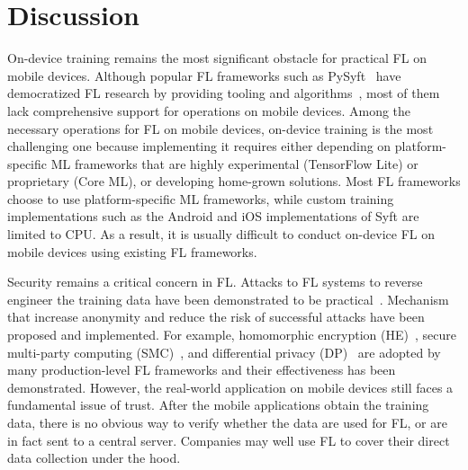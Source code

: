 \documentclass[conference]{IEEEtran}
\begin{document}
\section{Discussion}


On-device training remains the most significant obstacle for
practical FL on mobile devices.
Although popular FL frameworks such as
PySyft~\cite{ryffel2018generic,Ziller2021,hall2021syft}
have democratized FL research by providing tooling and
algorithms~\cite{sriraman2022device},
most of them lack comprehensive support for operations on mobile devices.
Among the necessary operations for FL on mobile devices,
on-device training is the most challenging one because
implementing it requires either depending on
platform-specific ML frameworks that are highly experimental (TensorFlow Lite)
or proprietary (Core ML),
or developing home-grown solutions.
Most FL frameworks choose to use platform-specific ML frameworks,
while custom training implementations such as
the Android and iOS implementations of Syft are limited to CPU.
As a result, it is usually difficult to conduct on-device FL
on mobile devices using existing FL frameworks.

Security remains a critical concern in FL.
Attacks to FL systems to reverse engineer the training data have been
demonstrated to be practical~\cite{sun2019really}.
Mechanism that increase anonymity and
reduce the risk of successful attacks have been proposed and implemented.
For example,
homomorphic encryption (HE)~\cite{wang2020homo},
secure multi-party computing (SMC)~\cite{bonawitz2016practical}, and
differential privacy
(DP)~\cite{dwork2006differential,geyer2017differentially} are
adopted by many production-level FL frameworks and
their effectiveness has been demonstrated.
However, the real-world application on mobile devices still faces a fundamental
issue of trust.
After the mobile applications obtain the training data,
there is no obvious way to verify whether the data are used for FL,
or are in fact sent to a central server.
Companies may well use FL to cover their direct data collection under the hood.

\printbibliography

\end{document}
